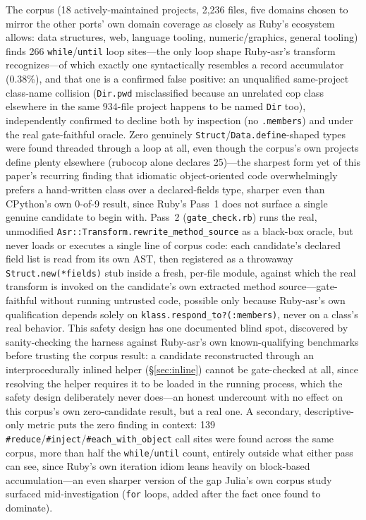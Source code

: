 \documentclass[sigplan,screen,review,anonymous]{acmart}
\begin{document}
The corpus (18 actively-maintained projects, 2{,}236 files, five
domains chosen to mirror the other ports' own domain coverage as
closely as Ruby's ecosystem allows: data structures, web, language
tooling, numeric/graphics, general tooling) finds 266
\texttt{while}/\texttt{until} loop sites---the only loop shape
Ruby-asr's transform recognizes---of which exactly one syntactically
resembles a record accumulator (0.38\%), and that one is a confirmed
false positive: an unqualified same-project class-name collision
(\texttt{Dir.pwd} misclassified because an unrelated cop class
elsewhere in the same 934-file project happens to be named
\texttt{Dir} too), independently confirmed to decline both by
inspection (no \texttt{.members}) and under the real gate-faithful
oracle. Zero genuinely \texttt{Struct}/\texttt{Data.define}-shaped
types were found threaded through a loop at all, even though the
corpus's own projects define plenty elsewhere (rubocop alone declares
25)---the sharpest form yet of this paper's recurring finding that
idiomatic object-oriented code overwhelmingly prefers a hand-written
class over a declared-fields type, sharper even than CPython's own 0-of-9
result, since Ruby's Pass~1 does not surface a single genuine candidate
to begin with. Pass~2 (\texttt{gate\_check.rb}) runs the real,
unmodified \texttt{Asr::Transform.rewrite\_method\_source} as a
black-box oracle, but never loads or executes a single line of corpus
code: each candidate's declared field list is read from its own AST,
then registered as a throwaway \texttt{Struct.new(*fields)} stub inside
a fresh, per-file module, against which the real transform is invoked
on the candidate's own extracted method source---gate-faithful without
running untrusted code, possible only because Ruby-asr's own
qualification depends solely on \texttt{klass.respond\_to?(:members)},
never on a class's real behavior. This safety design has one
documented blind spot, discovered by sanity-checking the harness
against Ruby-asr's own known-qualifying benchmarks before trusting the
corpus result: a candidate reconstructed through an interprocedurally
inlined helper (\S\ref{sec:inline}) cannot be
gate-checked at all, since resolving the helper requires it to be
loaded in the running process, which the safety design deliberately
never does---an honest undercount with no effect on this corpus's own
zero-candidate result, but a real one. A secondary, descriptive-only
metric puts the zero finding in context: 139
\texttt{\#reduce}/\texttt{\#inject}/\texttt{\#each\_with\_object} call
sites were found across the same corpus, more than half the
\texttt{while}/\texttt{until} count, entirely outside what either pass
can see, since Ruby's own iteration idiom leans heavily on block-based
accumulation---an even sharper version of the gap Julia's own corpus
study surfaced mid-investigation (\texttt{for} loops, added after the
fact once found to dominate).
\end{document}
